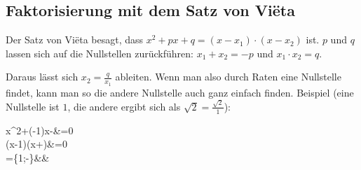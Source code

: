 \documentclass[12pt]{article}
\begin{document}
	\subsection{Faktorisierung mit dem Satz von Viëta}
		\begin{tcolorbox}[boxsep=0pt,top=.75cm,left=1cm,right=1cm, bottom=.65cm,arc=0pt,auto outer arc,colback=white,colframe=black, enlarge top by=.25cm, enlarge bottom by=.25cm]
		Der Satz von Viëta besagt, dass $x^2+px+q=(x-x_1)\cdot(x-x_2)$ ist. $p$ und $q$ lassen sich auf die Nullstellen zurückführen: $x_1+x_2=-p$ und $x_1\cdot x_2 = q$.
		\end{tcolorbox}
		\noindent Daraus lässt sich $x_2=\frac{q}{x_1}$ ableiten. Wenn man also durch Raten eine Nullstelle findet, kann man so die andere Nullstelle auch ganz einfach finden.\newline\newline
		Beispiel (eine Nullstelle ist $1$, die andere ergibt sich als $\sqrt{2} = \frac{\sqrt{2}}{1}$):
		\begin{flalign*}
			x^2+(\sqrt{2}-1)x-&=0\\
			(x-1)\cdot (x+)&=0\\
			=\{1;-\}&&
		\end{flalign*}
\end{document}
